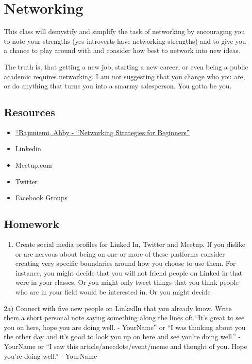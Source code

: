 \documentclass[]{book}
\providecommand{\tightlist}{%
  \setlength{\itemsep}{0pt}\setlength{\parskip}{0pt}}
\theoremstyle{definition}
\theoremstyle{definition}
\theoremstyle{definition}
\theoremstyle{remark}
\begin{document}
\chapter{Networking}\label{networking}

This class will demystify and simplify the task of networking by
encouraging you to note your strengths (yes introverts have networking
strengths) and to give you a chance to play around with and consider how
best to network into new ideas.

The truth is, that getting a new job, starting a new career, or even
being a public academic requires networking. I am not suggesting that
you change who you are, or do anything that turns you into a smarmy
salesperson. You gotta be you.

\section{Resources}\label{resources}

\begin{itemize}
\tightlist
\item
  \href{https://code.likeagirl.io/networking-strategies-for-beginners-986fe0b3efdf}{``Bajuniemi,
  Abby - ``Networking Strategies for Beginners''}
\item
  Linkedin
\item
  Meetup.com
\item
  Twitter
\item
  Facebook Groups
\end{itemize}

\section{Homework}\label{homework-1}

\begin{enumerate}
\def\labelenumi{\arabic{enumi})}
\tightlist
\item
  Create social media profiles for Linked In, Twitter and Meetup. If you
  dislike or are nervous about being on one or more of these platforms
  consider creating very specific boundaries around how you choose to
  use them. For instance, you might decide that you will not friend
  people on Linked in that were in your classes. Or you might only tweet
  things that you think people who are in your field would be interested
  in. Or you might decide
\end{enumerate}

2a) Connect with five new people on LinkedIn that you already know.
Write them a short personal note saying something along the lines of:
``It's great to see you on here, hope you are doing well. - YourName''
or ``I was thinking about you the other day and it's good to look you up
on here and see you're doing well.'' - YourName or ``I saw this
article/anecdote/event/meme and thought of you. Hope you're doing
well.'' - YourName
\end{document}
